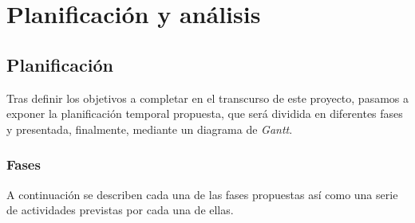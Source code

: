 \chapter{Planificación y análisis}
\label{cap:panificacion-analisis}

\section{Planificación}
\label{sec:planificacion}

Tras definir los objetivos a completar en el transcurso de este proyecto, pasamos a exponer la planificación temporal propuesta, que será dividida en diferentes fases y presentada, finalmente, mediante un diagrama de \textit{Gantt}.

\subsection{Fases}

A continuación se describen cada una de las fases propuestas así como una serie de actividades previstas por cada una de ellas.

